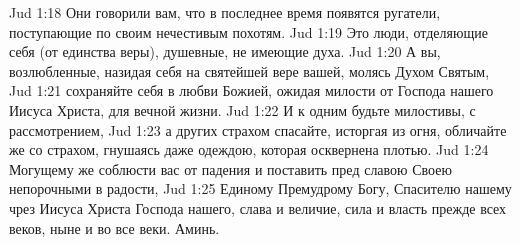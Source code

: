 \vs Jud 1:18 Они говорили вам, что в последнее время появятся ругатели, поступающие по своим нечестивым похотям.
\vs Jud 1:19 Это люди, отделяющие себя (от единства веры), душевные, не имеющие духа.
\vs Jud 1:20 А вы, возлюбленные, назидая себя на святейшей вере вашей, молясь Духом Святым,
\vs Jud 1:21 сохраняйте себя в любви Божией, ожидая милости от Господа нашего Иисуса Христа, для вечной жизни.
\vs Jud 1:22 И к одним будьте милостивы, с рассмотрением,
\vs Jud 1:23 а других страхом спасайте, исторгая из огня, обличайте же со страхом, гнушаясь даже одеждою, которая осквернена плотью.
\rsbpar\vs Jud 1:24 Могущему же соблюсти вас от падения и поставить пред славою Своею непорочными в радости,
\vs Jud 1:25 Единому Премудрому Богу, Спасителю нашему чрез Иисуса Христа Господа нашего, слава и величие, сила и власть прежде всех веков, ныне и во все веки. Аминь.

